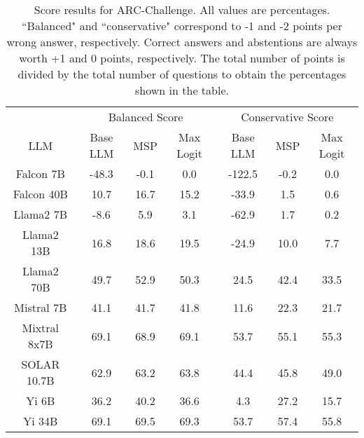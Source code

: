 \begin{table*}
\centering
\begin{tabular}{c|c|c|c|c|c|c}
& \multicolumn{3}{c|}{Balanced Score} & \multicolumn{3}{c}{Conservative Score} \\ 
LLM & Base LLM & MSP & Max Logit & Base LLM & MSP & Max Logit\\ \hline
Falcon 7B & -48.3 & -0.1 & 0.0 & -122.5 & -0.2 & 0.0\\
Falcon 40B & 10.7 & 16.7 & 15.2 & -33.9 & 1.5 & 0.6\\
Llama2 7B & -8.6 & 5.9 & 3.1 & -62.9 & 1.7 & 0.2\\
Llama2 13B & 16.8 & 18.6 & 19.5 & -24.9 & 10.0 & 7.7\\
Llama2 70B & 49.7 & 52.9 & 50.3 & 24.5 & 42.4 & 33.5\\
Mistral 7B & 41.1 & 41.7 & 41.8 & 11.6 & 22.3 & 21.7\\
Mixtral 8x7B & 69.1 & 68.9 & 69.1 & 53.7 & 55.1 & 55.3\\
SOLAR 10.7B & 62.9 & 63.2 & 63.8 & 44.4 & 45.8 & 49.0\\
Yi 6B & 36.2 & 40.2 & 36.6 & 4.3 & 27.2 & 15.7\\
Yi 34B & 69.1 & 69.5 & 69.3 & 53.7 & 57.4 & 55.8\\
\hline
\end{tabular}
\caption{Score results for ARC-Challenge. All values are percentages. ``Balanced" and ``conservative" correspond to -1 and -2 points per wrong answer, respectively. Correct answers and abstentions are always worth +1 and 0 points, respectively. The total number of points is divided by the total number of questions to obtain the percentages shown in the table.}
\label{tab:arc_score}
\end{table*}

